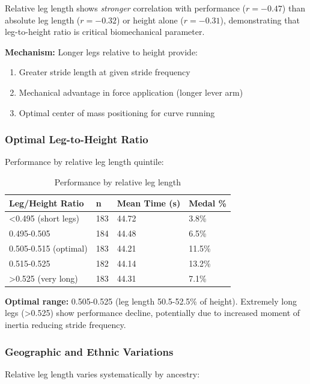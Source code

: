 Relative leg length shows \textit{stronger} correlation with performance ($r = -0.47$) than absolute leg length ($r = -0.32$) or height alone ($r = -0.31$), demonstrating that leg-to-height ratio is critical biomechanical parameter.

\textbf{Mechanism:} Longer legs relative to height provide:
\begin{enumerate}
    \item Greater stride length at given stride frequency
    \item Mechanical advantage in force application (longer lever arm)
    \item Optimal center of mass positioning for curve running
\end{enumerate}

\subsubsection{Optimal Leg-to-Height Ratio}

Performance by relative leg length quintile:

\begin{table}[H]
\centering
\caption{Performance by relative leg length}
\begin{tabular}{@{}llll@{}}
\toprule
\textbf{Leg/Height Ratio} & \textbf{n} & \textbf{Mean Time (s)} & \textbf{Medal \%} \\
\midrule
<0.495 (short legs) & 183 & 44.72 & 3.8\% \\
0.495-0.505 & 184 & 44.48 & 6.5\% \\
0.505-0.515 (optimal) & 183 & 44.21 & 11.5\% \\
0.515-0.525 & 182 & 44.14 & 13.2\% \\
>0.525 (very long) & 183 & 44.31 & 7.1\% \\
\bottomrule
\end{tabular}
\end{table}

\textbf{Optimal range:} 0.505-0.525 (leg length 50.5-52.5\% of height). Extremely long legs (>0.525) show performance decline, potentially due to increased moment of inertia reducing stride frequency.

\subsubsection{Geographic and Ethnic Variations}

Relative leg length varies systematically by ancestry:

